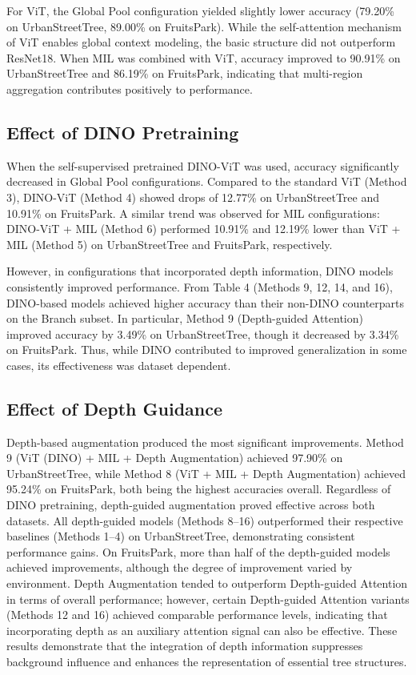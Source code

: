 For ViT, the Global Pool configuration yielded slightly lower accuracy (79.20\% on UrbanStreetTree, 89.00\% on FruitsPark). While the self-attention mechanism of ViT enables global context modeling, the basic structure did not outperform ResNet18. When MIL was combined with ViT, accuracy improved to 90.91\% on UrbanStreetTree and 86.19\% on FruitsPark, indicating that multi-region aggregation contributes positively to performance.

\subsection{Effect of DINO Pretraining}
When the self-supervised pretrained DINO-ViT was used, accuracy significantly decreased in Global Pool configurations. Compared to the standard ViT (Method 3), DINO-ViT (Method 4) showed drops of 12.77\% on UrbanStreetTree and 10.91\% on FruitsPark. A similar trend was observed for MIL configurations: DINO-ViT + MIL (Method 6) performed 10.91\% and 12.19\% lower than ViT + MIL (Method 5) on UrbanStreetTree and FruitsPark, respectively. 

However, in configurations that incorporated depth information, DINO models consistently improved performance. From Table 4 (Methods 9, 12, 14, and 16), DINO-based models achieved higher accuracy than their non-DINO counterparts on the Branch subset. In particular, Method 9 (Depth-guided Attention) improved accuracy by 3.49\% on UrbanStreetTree, though it decreased by 3.34\% on FruitsPark. Thus, while DINO contributed to improved generalization in some cases, its effectiveness was dataset dependent.

\subsection{Effect of Depth Guidance}
Depth-based augmentation produced the most significant improvements. Method 9 (ViT (DINO) + MIL + Depth Augmentation) achieved 97.90\% on UrbanStreetTree, while Method 8 (ViT + MIL + Depth Augmentation) achieved 95.24\% on FruitsPark, both being the highest accuracies overall. Regardless of DINO pretraining, depth-guided augmentation proved effective across both datasets. All depth-guided models (Methods 8–16) outperformed their respective baselines (Methods 1–4) on UrbanStreetTree, demonstrating consistent performance gains. On FruitsPark, more than half of the depth-guided models achieved improvements, although the degree of improvement varied by environment. Depth Augmentation tended to outperform Depth-guided Attention in terms of overall performance; however, certain Depth-guided Attention variants (Methods 12 and 16) achieved comparable performance levels, indicating that incorporating depth as an auxiliary attention signal can also be effective. These results demonstrate that the integration of depth information suppresses background influence and enhances the representation of essential tree structures.

